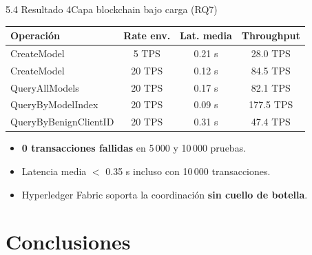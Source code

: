 \begin{frame}{5.4 Resultado 4}{Capa blockchain bajo carga (RQ7)}
  \begin{center}
  \small
  \begin{tabular}{@{}lccc@{}}
    \toprule
    \textbf{Operación} & \textbf{Rate env.} & \textbf{Lat. media} & \textbf{Throughput} \\
    \midrule
    CreateModel              & 5 TPS  & 0.21 s & 28.0 TPS  \\
    CreateModel              & 20 TPS & 0.12 s & 84.5 TPS  \\
    QueryAllModels           & 20 TPS & 0.17 s & 82.1 TPS  \\
    QueryByModelIndex        & 20 TPS & 0.09 s & 177.5 TPS \\
    QueryByBenignClientID    & 20 TPS & 0.31 s & 47.4 TPS  \\
    \bottomrule
  \end{tabular}
  \end{center}
  \vfill
  \begin{itemize}\small
    \item \textbf{0 transacciones fallidas} en 5\,000 y 10\,000 pruebas.
    \item Latencia media $<$ 0.35 s incluso con 10\,000 transacciones.
    \item Hyperledger Fabric soporta la coordinación \textbf{sin cuello de botella}.
  \end{itemize}
\end{frame}

\section{Conclusiones}

